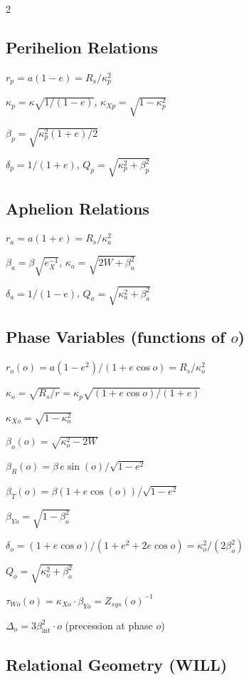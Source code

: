 \documentclass[10pt, a4paper]{article}
\begin{document}
\begin{multicols}{2}
\subsection{Perihelion Relations}

$r_{p} = a(1-e)=R_s/\kappa_p^2$

$\kappa_{p} = \kappa\sqrt{1/(1-e)}$, \quad $\kappa_{Xp} = \sqrt{1-\kappa_{p}^2}$

$\beta_{p} = \sqrt{\kappa_{p}^{2}(1+e)/2}$

$\delta_p = 1/(1+e)$, \quad $Q_{p} = \sqrt{\kappa_{p}^{2}+\beta_{p}^{2}}$

\subsection{Aphelion Relations}

$r_a=a(1+e)=R_s/\kappa_a^2$

$\beta_{a} = \beta\sqrt{e_{X}^{-1}}$, \quad $\kappa_{a} = \sqrt{2W+\beta_{a}^{2}}$

$\delta_a = 1/(1-e)$, \quad $Q_{a} = \sqrt{\kappa_{a}^{2}+\beta_{a}^{2}}$

\subsection{Phase Variables (functions of $o$)}

$r_o(o)= a(1-e^{2})/(1+e\cos o) = R_s/\kappa_o^2$

$\kappa_{o} = \sqrt{R_{s}/r} = \kappa_{p}\sqrt{(1+e\cos o)/(1+e)}$

$\kappa_{Xo} = \sqrt{1 - \kappa_o^{2}}$

$\beta_{o}(o) = \sqrt{\kappa_{o}^{2}-2W}$

$\beta_{R}(o)=\beta\,e\sin(o)/\sqrt{1-e^{2}}$

$\beta_{T}(o)=\beta(1+e\cos(o))/\sqrt{1-e^{2}}$

$\beta_{Yo} = \sqrt{1 - \beta_o^{2}}$

$\delta_{o} = (1+e\cos o)/(1+e^{2}+2e\cos o) = \kappa_{o}^2/(2\beta_{o}^2)$

$Q_{o} = \sqrt{\kappa_{o}^{2}+\beta_{o}^{2}}$

$\tau_{Wo}(o)=\kappa_{Xo}\cdot\beta_{Yo}= Z_{sys}(o)^{-1}$

$\Delta_o=3\beta_{\text{int}}^{2} \cdot o$ (precession at phase $o$)

\subsection{Relational Geometry (WILL)}


\end{multicols}
\end{document}
